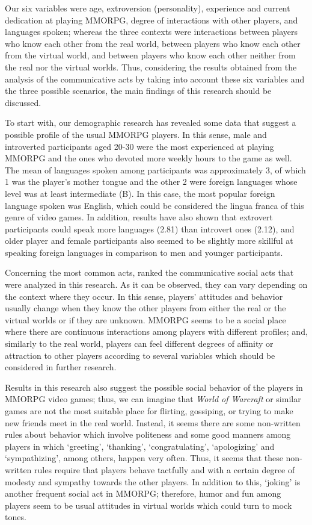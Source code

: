\documentclass[english]{textolivre}
\begin{document}
Our six variables were age, extroversion (personality), experience and current dedication at playing MMORPG, degree of interactions with other players, and languages spoken; whereas the three contexts were interactions between players who know each other from the real world, between players who know each other from the virtual world, and between players who know each other neither from the real nor the virtual worlds. Thus, considering the results obtained from the analysis of the communicative acts by taking into account these six variables and the three possible scenarios, the main findings of this research should be discussed.

To start with, our demographic research has revealed some data that suggest a possible profile of the usual MMORPG players. In this sense, male and introverted participants aged 20-30 were the most experienced at playing MMORPG and the ones who devoted more weekly hours to the game as well. The mean of languages spoken among participants was approximately 3, of which 1 was the player’s mother tongue and the other 2 were foreign languages whose level was at least intermediate (B). In this case, the most popular foreign language spoken was English, which could be considered the lingua franca of this genre of video games. In addition, results have also shown that extrovert participants could speak more languages (2.81) than introvert ones (2.12), and older player and female participants also seemed to be slightly more skillful at speaking foreign languages in comparison to men and younger participants. 

Concerning the most common acts,  ranked the communicative social acts that were analyzed in this research. As it can be observed, they can vary depending on the context where they occur. In this sense, players’ attitudes and behavior usually change when they know the other players from either the real or the virtual worlds or if they are unknown. MMORPG seems to be a social place where there are continuous interactions among players with different profiles; and, similarly to the real world, players can feel different degrees of affinity or attraction to other players according to several variables which should be considered in further research. 

Results in this research also suggest the possible social behavior of the players in MMORPG video games; thus, we can imagine that \emph{World of Warcraft} or similar games are not the most suitable place for flirting, gossiping, or trying to make new friends meet in the real world. Instead, it seems there are some non-written rules about behavior which involve politeness and some good manners among players in which ‘greeting’, ‘thanking’, ‘congratulating’, ‘apologizing’ and ‘sympathizing’, among others, happen very often. Thus, it seems that these non-written rules require that players behave tactfully and with a certain degree of modesty and sympathy towards the other players. In addition to this, ‘joking’ is another frequent social act in MMORPG; therefore, humor and fun among players seem to be usual attitudes in virtual worlds which could turn to mock tones. 
\end{document}
